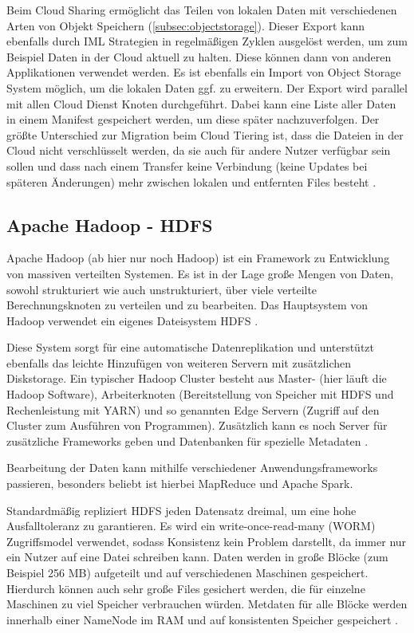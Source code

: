 Beim Cloud Sharing ermöglicht das Teilen von lokalen Daten mit verschiedenen Arten von Objekt Speichern (\autoref{subsec:objectstorage}). Dieser Export kann ebenfalls durch IML Strategien in regelmäßigen Zyklen ausgelöst werden, um zum Beispiel Daten in der Cloud aktuell zu halten. Diese können dann von anderen Applikationen verwendet werden. Es ist ebenfalls ein Import von Object Storage System möglich, um die lokalen Daten ggf. zu erweitern.
Der Export wird parallel mit allen Cloud Dienst Knoten durchgeführt. Dabei kann eine Liste aller Daten in einem Manifest gespeichert werden, um diese später nachzuverfolgen.
Der größte Unterschied zur Migration beim Cloud Tiering ist, dass die Dateien in der Cloud nicht verschlüsselt werden, da sie auch für andere Nutzer verfügbar sein sollen und dass nach einem Transfer keine Verbindung (keine Updates bei späteren Änderungen) mehr zwischen lokalen und entfernten Files besteht \parencite[S. 109]{ibm.2017}.

\subsection{Apache Hadoop - HDFS}

Apache Hadoop (ab hier nur noch Hadoop) ist ein Framework zu Entwicklung von massiven verteilten Systemen. Es ist in der Lage große Mengen von Daten, sowohl strukturiert wie auch unstrukturiert, über viele verteilte Berechnungsknoten zu verteilen und zu bearbeiten. Das Hauptsystem von Hadoop verwendet ein eigenes Dateisystem HDFS \parencite[Kap. I,1]{alapati.2016}.

Diese System sorgt für eine automatische Datenreplikation und unterstützt ebenfalls das leichte Hinzufügen von weiteren Servern mit zusätzlichen Diskstorage. Ein typischer Hadoop Cluster besteht aus Master- (hier läuft die Hadoop Software), Arbeiterknoten (Bereitstellung von Speicher mit HDFS und Rechenleistung mit \ac{YARN}) und so genannten Edge Servern (Zugriff auf den Cluster zum Ausführen von Programmen). Zusätzlich kann es noch Server für zusätzliche Frameworks geben und Datenbanken für spezielle Metadaten \parencite[Kap. I,1]{alapati.2016}.

Bearbeitung der Daten kann mithilfe verschiedener Anwendungsframeworks passieren, besonders beliebt ist hierbei MapReduce und Apache Spark.

Standardmäßig repliziert HDFS jeden Datensatz dreimal, um eine hohe Ausfalltoleranz zu garantieren. Es wird ein  write-once-read-many (\ac{WORM}) Zugriffsmodel verwendet, sodass Konsistenz kein Problem darstellt, da immer nur ein Nutzer auf eine Datei schreiben kann. Daten werden in große Blöcke (zum Beispiel 256 MB) aufgeteilt und auf verschiedenen Maschinen gespeichert. Hierdurch können auch sehr große Files gesichert werden, die für einzelne Maschinen zu viel Speicher verbrauchen würden. Metdaten für alle Blöcke werden innerhalb einer NameNode im RAM und auf konsistenten Speicher gespeichert  \parencite[Kap. I,2]{alapati.2016}.

